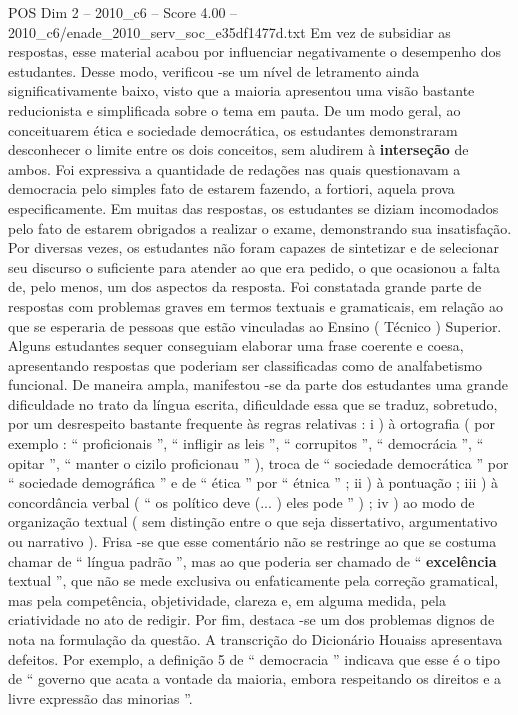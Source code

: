 \begin{textsample}{POS Dim 2 – 2010\_c6 – Score 4.00 – 2010\_c6/enade\_2010\_serv\_soc\_e35df1477d.txt}
Em vez de subsidiar as respostas, esse material acabou por influenciar negativamente o desempenho dos estudantes.
Desse modo, verificou -se um nível de letramento ainda significativamente baixo, visto que a maioria apresentou uma visão bastante reducionista e simplificada sobre o tema em pauta.
De um modo geral, ao conceituarem ética e sociedade democrática, os estudantes demonstraram desconhecer o limite entre os dois conceitos, sem aludirem à \textbf{interseção} de ambos.
Foi expressiva a quantidade de redações nas quais questionavam a democracia pelo simples fato de estarem fazendo, a fortiori, aquela prova especificamente.
Em muitas das respostas, os estudantes se diziam incomodados pelo fato de estarem obrigados a realizar o exame, demonstrando sua insatisfação.
Por diversas vezes, os estudantes não foram capazes de sintetizar e de selecionar seu discurso o suficiente para atender ao que era pedido, o que ocasionou a falta de, pelo menos, um dos aspectos da resposta.
Foi constatada grande parte de respostas com problemas graves em termos textuais e gramaticais, em relação ao que se esperaria de pessoas que estão vinculadas ao Ensino ( Técnico ) Superior.
Alguns estudantes sequer conseguiam elaborar uma frase coerente e coesa, apresentando respostas que poderiam ser classificadas como de analfabetismo funcional.
De maneira ampla, manifestou -se da parte dos estudantes uma grande dificuldade no trato da língua escrita, dificuldade essa que se traduz, sobretudo, por um desrespeito bastante frequente às regras relativas : i ) à ortografia ( por exemplo : “ proficionais ”, “ infligir as leis ”, “ corrupitos ”, “ democrácia ”, “ opitar ”, “ manter o cizilo proficionau ” ), troca de “ sociedade democrática ” por “ sociedade demográfica ” e de “ ética ” por “ étnica ” ; ii ) à pontuação ; iii ) à concordância verbal ( “ os político deve (... ) eles pode ” ) ; iv ) ao modo de organização textual ( sem distinção entre o que seja dissertativo, argumentativo ou narrativo ).
Frisa -se que esse comentário não se restringe ao que se costuma chamar de “ língua padrão ”, mas ao que poderia ser chamado de “ \textbf{excelência} textual ”, que não se mede exclusiva ou enfaticamente pela correção gramatical, mas pela competência, objetividade, clareza e, em alguma medida, pela criatividade no ato de redigir.
Por fim, destaca -se um dos problemas dignos de nota na formulação da questão.
A transcrição do Dicionário Houaiss apresentava defeitos.
Por exemplo, a definição 5 de “ democracia ” indicava que esse é o tipo de “ governo que acata a vontade da maioria, embora respeitando os direitos e a livre expressão das minorias ”.

\end{textsample}
